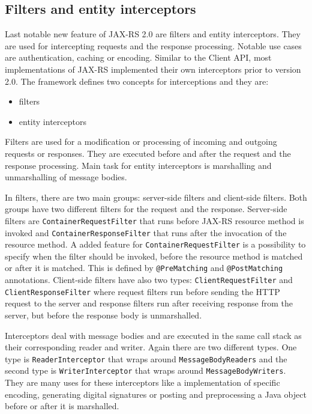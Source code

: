 \documentclass[12pt,final,oneside]{fithesis2}
\begin{document}
\subsection*{Filters and entity interceptors}
Last notable new feature of JAX-RS 2.0 are filters and entity interceptors. They are used for intercepting requests and the response processing. Notable use cases are authentication, caching or encoding. Similar to the Client API, most implementations of JAX-RS implemented their own interceptors prior to version 2.0. The framework defines two concepts for interceptions and they are:
\begin{itemize}
\item 
filters

\item
entity interceptors
\end{itemize}

Filters are used for a modification or processing of incoming and outgoing requests or responses. They are executed before and after the request and the response processing. Main task for entity interceptors is marshalling and unmarshalling of message bodies.

In filters, there are two main groups: server-side filters and client-side filters. Both groups have two different filters for the request and  the response. Server-side filters are \texttt{ContainerRequestFilter} that runs before JAX-RS resource method is invoked and \texttt{ContainerResponseFilter} that runs after the invocation of the resource method. A added feature for \texttt{ContainerRequestFilter} is a possibility to specify when the filter should be invoked, before the resource method is matched or after it is matched. This is defined by \texttt{@PreMatching} and \texttt{@PostMatching} annotations. Client-side filters have also two types: \texttt{ClientRequestFilter} and \texttt{ClientResponseFilter} where request filters run before sending the HTTP request to the server and response filters run after receiving response from the server, but before the response body is unmarshalled. \cite{jax-rs-2.0}\cite{resteasy-book}

Interceptors deal with message bodies and are executed in the same call stack as their corresponding reader and writer. Again there are two different types. One type is \texttt{ReaderInterceptor} that wraps around \texttt{MessageBodyReaders} and the second type is \texttt{WriterInterceptor} that wraps around \texttt{MessageBodyWriters}. They are many uses for these interceptors like a implementation of specific encoding, generating digital signatures or posting and preprocessing a Java object before or after it is marshalled.\cite{jax-rs-2.0}
\end{document}
